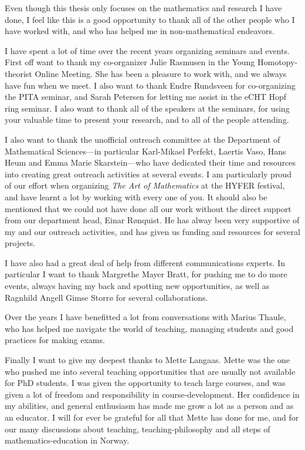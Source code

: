 Even though this thesis only focuses on the mathematics and research I have done, I feel like this is a good opportunity to thank all of the other people who I have worked with, and who has helped me in non-mathematical endeavors. 

I have spent a lot of time over the recent years organizing seminars and events. First off want to thank my co-organizer Julie Rasmusen in the Young Homotopy-theorist Online Meeting. She has been a pleasure to work with, and we always have fun when we meet. I also want to thank Endre Rundsveen for co-organizing the PITA seminar, and Sarah Petersen for letting me assist in the eCHT Hopf ring seminar. I also want to thank all of the speakers at the seminars, for using your valuable time to present your research, and to all of the people attending. 

I also want to thank the unofficial outreach committee at the Department of Mathematical Sciences---in particular Karl-Mikael Perfekt, Laertis Vaso, Hans Heum and Emma Marie Skarstein---who have dedicated their time and resources into creating great outreach activities at several events. I am particularly proud of our effort when organizing \emph{The Art of Mathematics} at the HYFER festival, and have learnt a lot by working with every one of you. It should also be mentioned that we could not have done all our work without the direct support from our department head, Einar Rønquist. He has alway been very supportive of my and our outreach activities, and has given us funding and resources for several projects. 

I have also had a great deal of help from different communications experts. In particular I want to thank Margrethe Mayer Bratt, for pushing me to do more events, always having my back and spotting new opportunities, as well as Ragnhild Angell Gimse Storrø for several collaborations. 

Over the years I have benefitted a lot from conversations with Marius Thaule, who has helped me navigate the world of teaching, managing students and good practices for making exams. 

Finally I want to give my deepest thanks to Mette Langaas. Mette was the one who pushed me into several teaching opportunities that are usually not available for PhD students. I was given the opportunity to teach large courses, and was given a lot of freedom and responsibility in course-development. Her confidence in my abilities, and general enthusiasm has made me grow a lot as a person and as an educator. I will for ever be grateful for all that Mette has done for me, and for our many discussions about teaching, teaching-philosophy and all steps of mathematics-education in Norway. 


